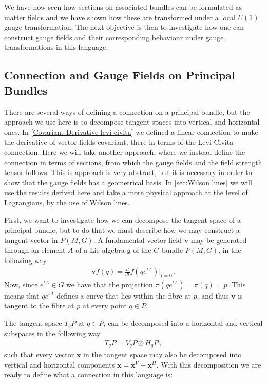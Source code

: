 We have now seen how sections on associated bundles can be formulated as matter fields and we have shown how these are transformed under a local $U(1)$ gauge transformation. The next objective is then to investigate how one can construct gauge fields and their corresponding behaviour under gauge transformations in this language.

\subsection*{Connection and Gauge Fields on Principal Bundles}
There are several ways of defining a connection on a principal bundle, but the approach we use here is to decompose tangent spaces into vertical and horizontal ones. In \cref{Covariant Derivative levi civita} we defined a linear connection to make the derivative of vector fields covariant, there in terms of the Levi-Civita connection. Here we will take another approach, where we instead define the connection in terms of sections, from which the gauge fields and the field strength tensor follows. This is approach is very abstract, but it is necessary in order to show that the gauge fields has a geometrical basis. In \cref{sec:Wilson lines} we will use the results derived here and take a more physical approach at the level of Lagrangians, by the use of Wilson lines. 

\medskip
First, we want to investigate how we can decompose the tangent space of a principal bundle, but to do that we must describe how we may construct a tangent vector in $P(M,G)$. A fundamental vector field $\textbf{v}$ may be generated through an element $A$ of a Lie algebra $\mathfrak{g}$ of the $G$-bundle $P(M,G)$, in the following way
\begin{align}
    \textbf{v}f(q)=\frac{d}{dt}f(qe^{tA})|_{t=0}\,.
\end{align}
Now, since $e^{tA}\in G$ we have that the projection $\pi(qe^{tA})=\pi(q)=p$. This means that $qe^{tA}$ defines a curve that lies within the fibre at $p$, and thus $\textbf{v}$ is tangent to the fibre at $p$ at every point $q\in P$. 

The tangent space $T_{q}P$ at $q\in P$, can be decomposed into a horizontal and vertical subspaces in the following way
\begin{align}
    T_{q}P=V_{q}P\otimes H_{q}P\,,
\end{align}
such that every vector $\textbf{x}$ in the tangent space may also be decomposed into vertical and horizontal components $\textbf{x}=\textbf{x}^{V}+\textbf{x}^{H}$. With this decomposition we are ready to define what a connection in this language is:

